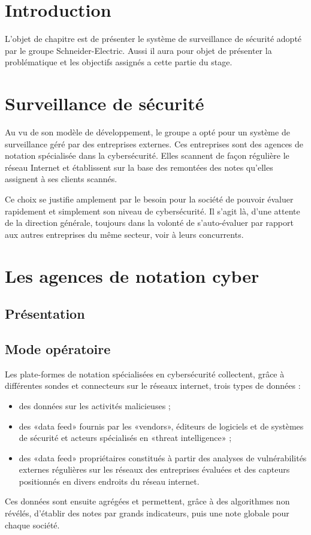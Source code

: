 \documentclass[a4paper,12pt]{book}
\theoremstyle{break}
\begin{document}
\section*{Introduction}
L’objet de chapitre est de présenter le système de surveillance de sécurité adopté par le groupe Schneider-Electric. Aussi il aura pour objet de présenter la problématique et les objectifs assignés a cette partie du stage.  

\section{Surveillance de sécurité}
Au vu de son modèle de développement, le groupe a opté pour un système de surveillance géré par des entreprises externes. Ces entreprises sont des agences de notation spécialisée dans la cybersécurité. Elles scannent de façon régulière le réseau Internet et établissent sur la base des remontées des notes qu’elles assignent à ses clients scannés. 


Ce choix se justifie amplement par le besoin pour la société de pouvoir évaluer rapidement et simplement son niveau de cybersécurité. Il s’agit là, d’une attente de la direction générale, toujours dans la volonté de s'auto-évaluer par rapport aux autres entreprises du même secteur, voir à leurs concurrents. 

\section{Les agences de notation cyber}
\subsection{Présentation}
\subsection{Mode opératoire}
Les plate-formes de notation spécialisées en cybersécurité collectent, grâce à différentes sondes et connecteurs sur le réseaux internet, trois types de données :
\begin{itemize}
    \item des données sur les activités malicieuses ; 
    \item des «data feed» fournis par les «vendors», éditeurs de logiciels et de systèmes de sécurité et acteurs spécialisés en «threat intelligence» ; 
    \item des «data feed» propriétaires constitués à partir des analyses de vulnérabilités externes régulières sur les réseaux des entreprises évaluées et des capteurs positionnés en divers endroits du réseau internet.
\end{itemize}
Ces données sont ensuite agrégées et permettent, grâce à des algorithmes non révélés, d’établir des notes par grands indicateurs, puis une note globale pour chaque société. 
\end{document}
